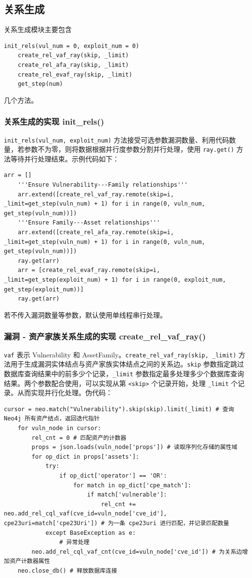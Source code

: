 \documentclass[a4paper,AutoFakeBold,oneside,12pt]{book}
\begin{document}
\subsection{关系生成}

关系生成模块主要包含
\begin{lstlisting}[style=lgeneral]
	init_rels(vul_num = 0, exploit_num = 0)
	create_rel_vaf_ray(skip, _limit)
	create_rel_afa_ray(skip, _limit)
	create_rel_evaf_ray(skip, _limit)
	get_step(num)
\end{lstlisting}
几个方法。

\subsubsection{关系生成的实现 init{\_}rels()}

\lstinline|init_rels(vul_num, exploit_num)| 方法接受可选参数漏洞数量、利用代码数量，若参数不为零，则将数据根据并行度参数分割并行处理，使用 \lstinline|ray.get()| 方法等待并行处理结束。示例代码如下：
\begin{lstlisting}[style=lgeneral]
	arr = []
	'''Ensure Vulnerability---Family relationships'''
	arr.extend([create_rel_vaf_ray.remote(skip=i, _limit=get_step(vuln_num) + 1) for i in range(0, vuln_num, get_step(vuln_num))])
	'''Ensure Family---Asset relationships'''
	arr.extend([create_rel_afa_ray.remote(skip=i, _limit=get_step(vuln_num) + 1) for i in range(0, vuln_num, get_step(vuln_num))])
	ray.get(arr)
	arr = [create_rel_evaf_ray.remote(skip=i, _limit=get_step(exploit_num) + 1) for i in range(0, exploit_num, get_step(exploit_num))]
	ray.get(arr)
\end{lstlisting}

若不传入漏洞数量等参数，默认使用单线程串行处理。

\subsubsection{漏洞 - 资产家族关系生成的实现 create{\_}rel{\_}vaf{\_}ray()\label{subsubsec:rel_vaf}}

\lstinline|vaf| 表示 Vulnerability 和 AssetFamily。\lstinline|create_rel_vaf_ray(skip, _limit)| 方法用于生成漏洞实体结点与资产家族实体结点之间的关系边。\lstinline|skip| 参数指定跳过数据库查询结果中的前多少个记录，\lstinline|_limit| 参数指定最多处理多少个数据库查询结果。两个参数配合使用，可以实现从第 \lstinline|<skip>| 个记录开始，处理 \lstinline|_limit| 个记录。从而实现并行化处理。伪代码：
\begin{lstlisting}[style=lgeneral]
	cursor = neo.match("Vulnerability").skip(skip).limit(_limit) # 查询 Neo4j 所有资产结点，返回迭代指针
	for vuln_node in cursor:
		rel_cnt = 0 # 匹配资产的计数器
		props = json.loads(vuln_node['props']) # 读取序列化存储的属性域
		for op_dict in props['assets']:
			try:
				if op_dict['operator'] == 'OR':
					for match in op_dict['cpe_match']:
						if match['vulnerable']:
							rel_cnt += neo.add_rel_cql_vaf(cve_id=vuln_node['cve_id'], cpe23uri=match['cpe23Uri']) # 为一条 cpe23uri 进行匹配，并记录匹配数量
			except BaseException as e:
				# 异常处理
		neo.add_rel_cql_vaf_cnt(cve_id=vuln_node['cve_id']) # 为关系边增加资产计数器属性
	neo.close_db() # 释放数据库连接
\end{lstlisting}
\end{document}
